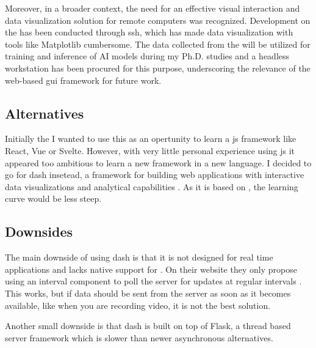 Moreover, in a broader context, the need for an effective visual interaction and data visualization solution for remote computers was recognized.
Development on the \jx has been conducted through \gls{ssh}, which has made data visualization with tools like Matplotlib cumbersome.
The data collected from the \sr will be utilized for training and inference of AI models during my Ph.D.
studies and a headless workstation has been procured for this purpose, underscoring the relevance of the web-based \gls{gui} framework for future work.


\subsection{Alternatives}
Initially the I wanted to use this as an opertunity to learn a \gls{js} framework like React, Vue or Svelte.
However, with very little personal experience using \gls{js} it appeared too ambitious to learn a new framework in a new language.
I decided to go for \gls{dash} insetead, a \py framework for building web applications with interactive data visualizations and analytical capabilities \cite{plotlyPlotlyLowCodeData}.
As it is based on \py, the learning curve would be less steep.

\subsection{Downsides}
The main downside of using \gls{dash} is that it is not designed for real time applications and lacks native support for .
On their website they only propose using an interval component to poll the server for updates at regular intervals  \cite{plotlyLiveUpdatesDasha}.
This works, but if data should be sent from the server as soon as it becomes available, like when you are recording video, it is not the best solution.

Another small downside is that \gls{dash} is built on top of Flask, a thread based server framework which is slower than newer asynchronous alternatives.

